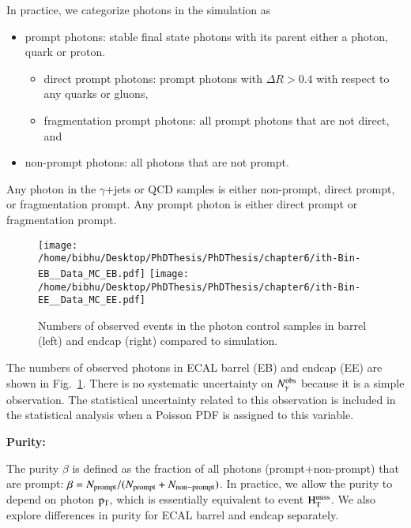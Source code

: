 In practice, we categorize photons in the simulation as 
\begin{itemize}
\item prompt photons: stable final state photons with its parent either a photon, quark or proton. 
  \begin{itemize}
  \item direct prompt photons: prompt photons with $\Delta R >0.4$ with respect to any quarks or gluons, 
  \item fragmentation prompt photons: all prompt photons that are not direct, and
  \end{itemize}
\item non-prompt photons: all photons that are not prompt.
\end{itemize} 
Any photon in the $\gamma$+jets or QCD samples is either non-prompt, direct prompt, or fragmentation prompt.  Any prompt photon is either direct prompt or fragmentation prompt. 
\begin{figure}[h]
\begin{center}
\texttt{[image: /home/bibhu/Desktop/PhDThesis/PhDThesis/chapter6/ith-Bin-EB\_\_Data\_MC\_EB.pdf]} %
\texttt{[image: /home/bibhu/Desktop/PhDThesis/PhDThesis/chapter6/ith-Bin-EE\_\_Data\_MC\_EE.pdf]} %
\caption{Numbers of observed events in the photon control samples in barrel (left) and endcap (right) compared to simulation.}
\label{fig:nobs}
\end{center}
\end{figure}

The numbers of observed photons in ECAL barrel (EB) and endcap (EE) are shown in Fig.~\ref{fig:nobs}.
There is no systematic uncertainty on $N_{\gamma}^{\rm obs}$ because it is a simple observation.  The 
statistical uncertainty related to this observation is included in the statistical analysis when a 
Poisson PDF is assigned to this variable.

{\bf Purity:}


The purity $\beta$ is defined as the fraction of all photons (prompt+non-prompt) that are prompt: 
$\beta = N_{\rm prompt} / (N_{\rm prompt}+N_{\rm non-prompt})$.  In practice, we allow the purity 
to depend on photon $\rm p_{T}$, which is essentially equivalent to event $\rm H_{T}^{miss}$.  We also explore 
differences in purity for ECAL barrel and endcap separately.


